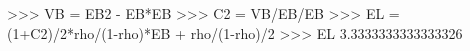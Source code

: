 
>>> VB = EB2 - EB*EB
>>> C2 = VB/EB/EB
>>> EL = (1+C2)/2*rho/(1-rho)*EB + rho/(1-rho)/2
>>> EL
3.3333333333333326

